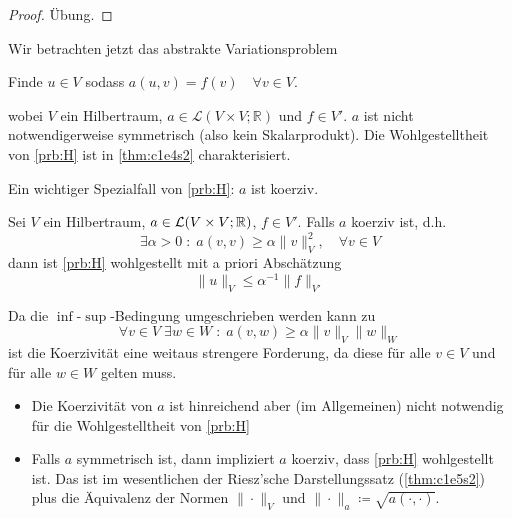 \documentclass[../skript.tex]{subfiles}
\begin{document}
\begin{proof}
	Übung.
\end{proof}

Wir betrachten jetzt das abstrakte Variationsproblem
\begin{problem} %
\label{prb:H}
Finde $u \in V$ sodass $a(u, v) = f(v) \quad \forall v \in V$.
\end{problem}
wobei $V$ ein Hilbertraum, $a\in\mathcal{L}(V\times V;\mathbb{R})$ und $f\in V'$. $a$ ist nicht notwendigerweise symmetrisch (also kein Skalarprodukt).
Die Wohlgestelltheit von \cref{prb:H} ist in \cref{thm:c1e4s2} charakterisiert.

Ein wichtiger Spezialfall von \cref{prb:H}: $a$ ist koerziv.

\begin{theorem}
\label{thm:c1e5s6}
	Sei $V$ ein Hilbertraum, $a\in\mathcal{L}(V\times V;\mathbb{R})$, $f\in V'$. Falls $a$ koerziv ist, d.h.
	\[
		\exists\alpha > 0 \; : \; a(v,v)\geq\alpha\|v\|_V^2,\quad\forall v\in V
	\]
	dann ist \cref{prb:H} wohlgestellt mit a priori Abschätzung
	\[
		\|u\|_V \leq\alpha^{-1}\|f\|_{V'}
	\]
\end{theorem}
Da die $\inf$-$\sup$-Bedingung umgeschrieben werden kann zu
\[
	\forall v\in V\;\exists w\in W \; :\;a(v,w)\geq\alpha\|v\|_V \| w \|_W
\]
ist die Koerzivität eine weitaus strengere Forderung, da diese für alle $v\in V$ und für alle $w\in W$ gelten muss.

\begin{remark}
	\begin{itemize}
		\item Die Koerzivität von $a$ ist hinreichend aber (im Allgemeinen) nicht notwendig für die Wohlgestelltheit von \cref{prb:H}
		\item Falls $a$ symmetrisch ist, dann impliziert $a$ koerziv, dass \cref{prb:H} wohlgestellt ist.
			Das ist im wesentlichen der Riesz'sche Darstellungssatz (\cref{thm:c1e5s2}) plus die Äquivalenz der Normen $\|\cdot\|_V$ und $\|\cdot\|_a \coloneqq \sqrt{a(\cdot,\cdot)}$.
	\end{itemize}
\end{remark}
\end{document}
